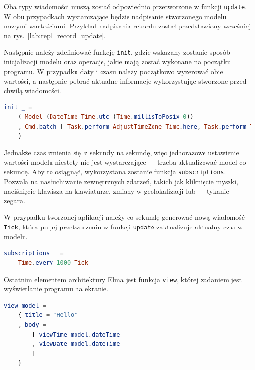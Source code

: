 \documentclass[twoside,a4paper]{report}
\begin{document}
Oba typy wiadomości muszą zostać odpowiednio przetworzone w funkcji \texttt{update}.
W obu przypadkach wystarczające będzie nadpisanie stworzonego modelu nowymi wartościami.
Przykład nadpisania rekordu został przedstawiony wcześniej na rys.~\ref{lab:repl_record_update}.

Następnie należy zdefiniować funkcję \texttt{init}, gdzie wskazany zostanie sposób inicjalizacji modelu oraz operacje, jakie mają zostać wykonane na początku programu.
W przypadku daty i czasu należy początkowo wyzerować obie wartości, a następnie pobrać aktualne informacje wykorzystując stworzone przed chwilą wiadomości.

\begin{lstlisting}[language=Elm]
init _ =
    ( Model (DateTime Time.utc (Time.millisToPosix 0))
    , Cmd.batch [ Task.perform AdjustTimeZone Time.here, Task.perform Tick Time.now ]
    )
\end{lstlisting}

Jednakże czas zmienia się z sekundy na sekundę, więc jednorazowe ustawienie wartości modelu niestety nie jest wystarczające --- trzeba aktualizować model co sekundę.
Aby to osiągnąć, wykorzystana zostanie funkcja \texttt{subscriptions}.
Pozwala na nasłuchiwanie zewnętrznych zdarzeń, takich jak kliknięcie myszki, naciśnięcie klawisza na klawiaturze, zmiany w geolokalizacji lub --- tykanie zegara.

W przypadku tworzonej aplikacji należy co sekundę generować nową wiadomość \texttt{Tick}, która po jej przetworzeniu w funkcji \texttt{update} zaktualizuje aktualny czas w modelu.

\begin{lstlisting}[language=Elm]
subscriptions _ =
    Time.every 1000 Tick
\end{lstlisting}

Ostatnim elementem architektury Elma jest funkcja \texttt{view}, której zadaniem jest wyświetlanie programu na ekranie.

\begin{lstlisting}[language=Elm]
view model =
    { title = "Hello"
    , body =
        [ viewTime model.dateTime
        , viewDate model.dateTime
        ]
    }
\end{lstlisting}
\end{document}
